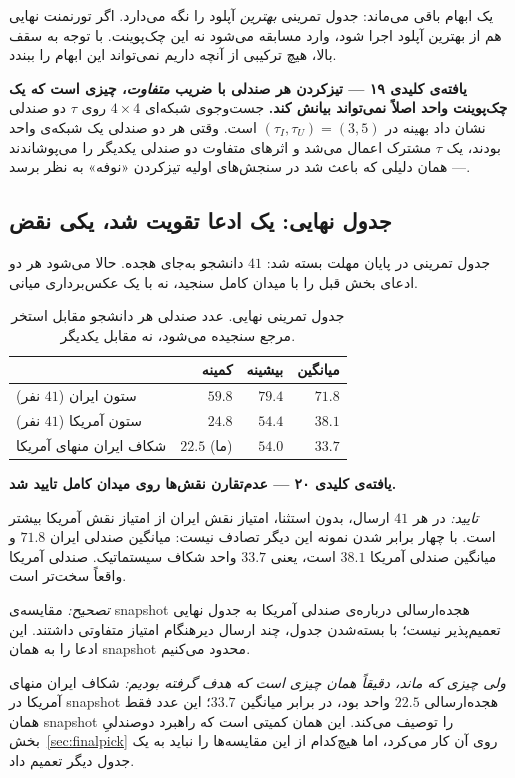 \documentclass[12pt,a4paper]{article}
\begin{document}
یک ابهام باقی می‌ماند: جدول تمرینی \emph{بهترین} آپلود را نگه می‌دارد. اگر
تورنمنت نهایی هم از بهترین آپلود اجرا شود،  وارد مسابقه
می‌شود نه این چک‌پوینت. با توجه به سقف بالا، هیچ ترکیبی از آنچه داریم
نمی‌تواند این ابهام را ببندد.

\begin{findbox}
\textbf{یافته‌ی کلیدی ۱۹ — تیزکردن هر صندلی با ضریب \emph{متفاوت}،
چیزی است که یک چک‌پوینت واحد اصلاً نمی‌تواند بیانش کند.}
جست‌وجوی شبکه‌ای $4\times4$ روی $\tau$ دو صندلی نشان داد بهینه در
$(\tau_I,\tau_U)=(3,5)$ است. وقتی هر دو صندلی یک شبکه‌ی واحد بودند، یک
$\tau$ مشترک اعمال می‌شد و اثرهای متفاوت دو صندلی یکدیگر را می‌پوشاندند
— همان دلیلی که باعث شد در سنجش‌های اولیه تیزکردن «نوفه» به نظر برسد.
\end{findbox}

\subsection{جدول نهایی: یک ادعا تقویت شد، یکی نقض}
\label{sec:finalboard}

جدول تمرینی در پایان مهلت بسته شد: $41$ دانشجو به‌جای هجده. حالا می‌شود
هر دو ادعای بخش قبل را با میدان کامل سنجید، نه با یک عکس‌برداری میانی.

\begin{table}[h]\centering\small
\begin{tabular}{lrrr}
\toprule
 & کمینه & بیشینه & میانگین\\
\midrule
ستون ایران ($41$ نفر) & $59.8$ & $79.4$ & $71.8$\\
ستون آمریکا ($41$ نفر) & $24.8$ & $54.4$ & $38.1$\\
\midrule
شکاف ایران منهای آمریکا & $\mathbf{22.5}$ (ما) & $54.0$ & $33.7$\\
\bottomrule
\end{tabular}
\caption{جدول تمرینی نهایی. عدد صندلی هر دانشجو مقابل استخر مرجع سنجیده
می‌شود، نه مقابل یکدیگر.}
\end{table}

\begin{findbox}
\textbf{یافته‌ی کلیدی ۲۰ — عدم‌تقارن نقش‌ها روی میدان کامل تایید شد.}

\emph{تایید:} در هر $41$ ارسال، بدون استثنا، امتیاز نقش ایران از امتیاز
نقش آمریکا بیشتر است. با چهار برابر شدن نمونه این دیگر تصادف نیست:
میانگین صندلی ایران $71.8$ و میانگین صندلی آمریکا $38.1$ است، یعنی
$33.7$ واحد شکاف سیستماتیک. صندلی آمریکا واقعاً سخت‌تر است.

\emph{تصحیح:} مقایسه‌ی snapshot هجده‌ارسالی درباره‌ی صندلی آمریکا به جدول
نهایی تعمیم‌پذیر نیست؛ با بسته‌شدن جدول، چند ارسال دیرهنگام امتیاز متفاوتی
داشتند. این ادعا را به همان snapshot محدود می‌کنیم.

\emph{ولی چیزی که ماند، دقیقاً همان چیزی است که هدف گرفته بودیم:}
شکاف ایران منهای آمریکا در snapshot هجده‌ارسالی $22.5$ واحد بود، در برابر
میانگین $33.7$؛ این عدد فقط همان snapshot را توصیف می‌کند.
این همان کمیتی است که راهبرد دو‌صندلیِ بخش~\ref{sec:finalpick} روی آن
کار می‌کرد، اما هیچ‌کدام از این مقایسه‌ها را نباید به یک جدول دیگر تعمیم داد.
\end{findbox}
\end{document}
